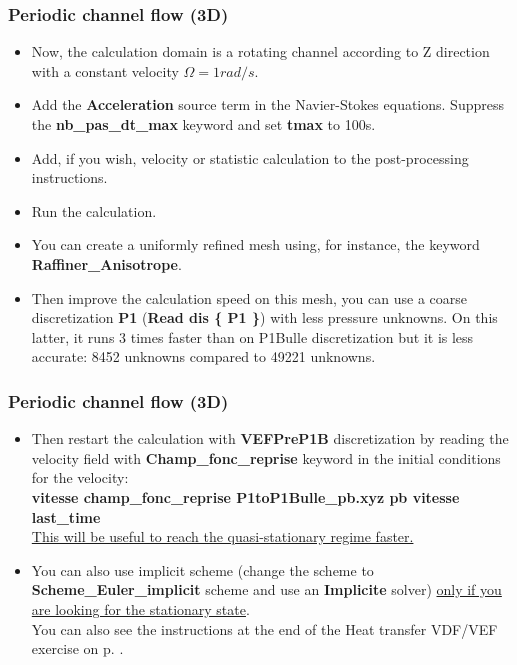 \documentclass[10pt, hyperref={unicode=true,pdfusetitle, bookmarks=true,bookmarksnumbered=false,bookmarksopen=false, breaklinks=false,pdfborder={0 0 1},backref=true,colorlinks=true,linkcolor=darkblue,pageanchor}]{beamer}
\begin{document}
\begin{frame}
\frametitle{Periodic channel flow (3D)}
\begin{block}{}

\begin{itemize}
\item Now, the calculation domain is a rotating channel according to Z direction with a constant velocity $\Omega=1 rad/s$. 

\item Add the \textbf{Acceleration} source term in the Navier-Stokes equations. Suppress the \textbf{nb\_pas\_dt\_max} keyword and set \textbf{tmax} to 100s.

\item Add, if you wish, velocity or statistic calculation to the post-processing instructions. 

\item Run the calculation.

\item You can create a uniformly refined mesh using, for instance, the keyword \textbf{Raffiner\_Anisotrope}.

\item Then improve the calculation speed on this mesh, you can use a coarse discretization \textbf{P1} (\textbf{Read dis \{ P1 \}}) with less pressure unknowns. On this latter, it runs 3 times faster than on P1Bulle discretization but it is less accurate: 8452 unknowns compared to 49221 unknowns.
\end{itemize}

\end{block}
\end{frame}
\begin{frame}
\frametitle{Periodic channel flow (3D)}
\begin{block}{}

\begin{itemize}
\item Then restart the calculation with \textbf{VEFPreP1B} discretization by reading the velocity field with \textbf{Champ\_fonc\_reprise} keyword in the initial conditions for the velocity:\\
\textbf{vitesse champ\_fonc\_reprise P1toP1Bulle\_pb.xyz  pb  vitesse  last\_time} \\
\underline{This will be useful to reach the quasi-stationary regime faster.}

\item You can also use implicit scheme (change the scheme to \textbf{Scheme\_Euler\_implicit} scheme and use an \textbf{Implicite} solver) \underline{only if you are looking for the stationary state}.\\ 
You can also see the instructions at the end of the Heat transfer VDF/VEF exercise on p. \pageref{schema_impl}.
\end{itemize}

\end{block}
\end{frame}
\end{document}
